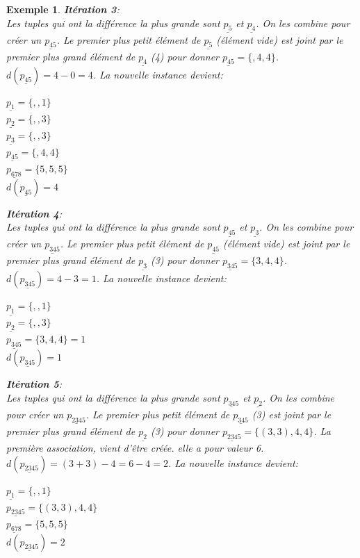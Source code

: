 \documentclass[a4paper,12pt]{report}
\theoremstyle{plain}				%
\newtheorem{example}{Exemple}
\theoremstyle{definition}				%
\begin{document}
\begin{itemize}
\begin{example}
\textbf{Itération 3}:\\
Les tuples qui ont la différence la plus grande sont
$\underline{p_{5}}$  et $\underline{p_{4}}$.
On les combine pour créer un $\underline{p_{45}}$. Le premier plus
petit élément de $\underline{p_{5}}$ (élément vide) est joint par le
premier plus grand élément de $\underline{p_{4}}$ (4) pour donner
$\underline{p_{45}} = \{,4,4\}$. $d(\underline{p_{45}}) = 4-0 = 4$.
La nouvelle instance devient:
\begin{multicols}{3}
$\underline{p_{1}} = \{,,1\}$\\
$\underline{p_{2}} = \{,,3\}$\\
$\underline{p_{3}} = \{,,3\}$\\
$\underline{p_{45}} = \{,4,4\}$\\
$\underline{p_{678}} = \{5,5,5\}$\\
$d(\underline{p_{45}}) = 4$
\end{multicols}

\textbf{Itération 4}:\\
Les tuples qui ont la différence la plus grande sont
$\underline{p_{45}}$  et $\underline{p_{3}}$.
On les combine pour créer un $\underline{p_{345}}$. Le premier plus
petit élément de $\underline{p_{45}}$ (élément vide) est joint par le
premier plus grand élément de $\underline{p_{3}}$ (3) pour donner
$\underline{p_{345}} = \{3,4,4\}$. $d(\underline{p_{345}}) = 4-3 =
1$.
La nouvelle instance devient:
\begin{multicols}{3}
$\underline{p_{1}} = \{,,1\}$\\
$\underline{p_{2}} = \{,,3\}$\\
$\underline{p_{345}} = \{3,4,4\}=1$\\
$d(\underline{p_{345}}) = 1$
\end{multicols}

\textbf{Itération 5}:\\
Les tuples qui ont la différence la plus grande sont
$\underline{p_{345}}$  et $\underline{p_{2}}$.
On les combine pour créer un $\underline{p_{2345}}$. Le premier plus
petit élément de $\underline{p_{345}}$ (3) est joint par le premier
plus grand élément de $\underline{p_{2}}$ (3) pour donner
$\underline{p_{2345}} = \{(3,3),4,4\}$. La première association, vient
d'être créée. elle a pour valeur 6.
$d(\underline{p_{2345}}) = (3+3)-4 = 6-4=2$. La nouvelle instance devient:
\begin{multicols}{2}
$\underline{p_{1}} = \{,,1\}$\\
$\underline{p_{2345}} = \{(3,3),4,4\}$\\
$\underline{p_{678}} = \{5,5,5\}$\\
$d(\underline{p_{2345}}) = 2$
\end{multicols}


\end{example}
\end{itemize}
\end{document}
